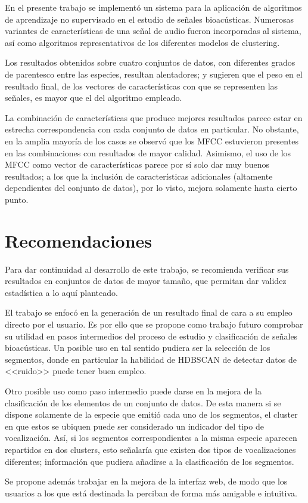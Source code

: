 En el presente trabajo se implementó un sistema para la aplicación de algoritmos de aprendizaje no supervisado en el estudio de señales bioacústicas.
Numerosas variantes de características de una señal de audio fueron incorporadas al sistema, así como algoritmos representativos de los diferentes modelos de clustering.

Los resultados obtenidos sobre cuatro conjuntos de datos, con diferentes grados de parentesco entre las especies, resultan alentadores;
y sugieren que el peso en el resultado final, de los vectores de características con que se representen las señales, es mayor que el del algoritmo empleado.

La combinación de características que produce mejores resultados parece estar en estrecha correspondencia con cada conjunto de datos en particular.
No obstante, en la amplia mayoría de los casos se observó que los MFCC estuvieron presentes en las combinaciones con resultados de mayor calidad.
Asimismo, el uso de los MFCC como vector de características parece por sí solo dar muy buenos resultados;
a los que la inclusión de características adicionales (altamente dependientes del conjunto de datos), por lo visto, mejora solamente hasta cierto punto.

\section*{Recomendaciones}\label{sec:recomendaciones}

Para dar continuidad al desarrollo de este trabajo, se recomienda verificar sus resultados en conjuntos de datos de mayor tamaño, que permitan dar validez estadística a lo aquí planteado.

El trabajo se enfocó en la generación de un resultado final de cara a su empleo directo por el usuario.
Es por ello que se propone como trabajo futuro comprobar su utilidad en pasos intermedios del proceso de estudio y clasificación de señales bioacústicas.
Un posible uso en tal sentido pudiera ser la selección de los segmentos, donde en particular la habilidad de HDBSCAN de detectar datos de <<ruido>> puede tener buen empleo.

Otro posible uso como paso intermedio puede darse en la mejora de la clasificación de los elementos de un conjunto de datos.
De esta manera si se dispone solamente de la especie que emitió cada uno de los segmentos, el cluster en que estos se ubiquen puede ser considerado un indicador del tipo de vocalización.
Así, si los segmentos correspondientes a la misma especie aparecen repartidos en dos clusters, esto señalaría que existen dos tipos de vocalizaciones diferentes;
información que pudiera añadirse a la clasificación de los segmentos.

Se propone además trabajar en la mejora de la interfaz web, de modo que los usuarios a los que está destinada la perciban de forma más amigable e intuitiva.